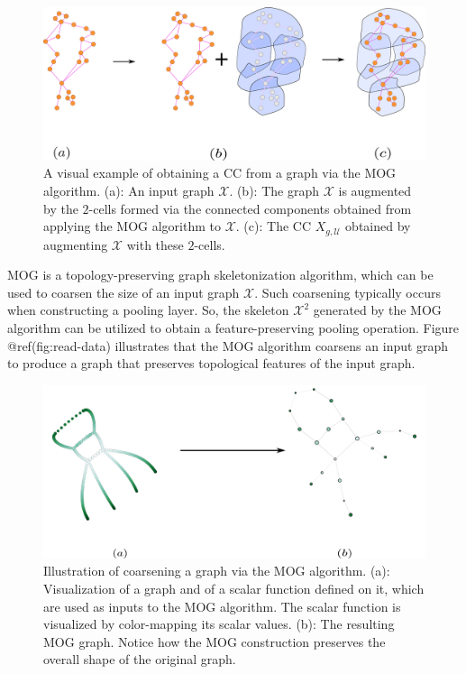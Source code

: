 \documentclass[
  12pt,
]{krantz}
\begin{document}
\begin{figure}

{\centering \includegraphics{figures/augmented_mapper_cc} 

}

\caption{A visual example of obtaining a CC from a graph via the MOG algorithm. (a): An input graph $\mathcal{X}$. (b): The graph $\mathcal{X}$ is augmented by the $2$-cells formed via the connected components obtained from applying the MOG algorithm to $\mathcal{X}$. (c): The CC $X_{g,\mathcal{U}}$ obtained by augmenting $\mathcal{X}$ with these $2$-cells.}\label{fig:mapper-as-pooling-operator}
\end{figure}

MOG is a topology-preserving graph skeletonization algorithm, which can
be used to coarsen the size of an input graph \(\mathcal{X}\). Such
coarsening typically occurs when constructing a pooling layer. So, the
skeleton \(\mathcal{X}^2\) generated by the MOG algorithm can be
utilized to obtain a feature-preserving pooling operation. Figure
@ref(fig:read-data) illustrates that the MOG algorithm coarsens an input
graph to produce a graph that preserves topological features of the
input graph.

\begin{figure}

{\centering \includegraphics{figures/mapper_and_pooling} 

}

\caption{Illustration of coarsening a graph via the MOG algorithm. (a): Visualization of a graph and of a scalar function defined on it, which are used as inputs to the MOG algorithm. The scalar function is visualized by color-mapping its scalar values. (b): The resulting MOG graph. Notice how the MOG construction preserves the overall shape of the original graph.}\label{fig:read-data}
\end{figure}
\end{document}
